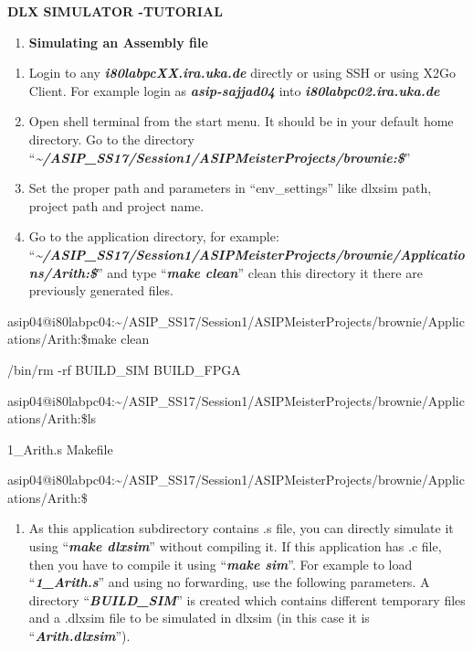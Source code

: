 \documentclass[
]{article}
\author{}
\date{}
\begin{document}
\textbf{DLX SIMULATOR -TUTORIAL}

\begin{enumerate}
\def\labelenumi{\Alph{enumi}.}
\item
  \textbf{Simulating an Assembly file}
\end{enumerate}

\begin{enumerate}
\def\labelenumi{\arabic{enumi}.}
\item
  Login to any \emph{\textbf{i80labpcXX.ira.uka.de}} directly or using
  SSH or using X2Go Client. For example login as
  \emph{\textbf{asip-sajjad04}} into
  \emph{\textbf{i80labpc02.ira.uka.de}}
\item
  Open shell terminal from the start menu. It should be in your default
  home directory. Go to the directory
  ``\emph{\textbf{\textasciitilde/ASIP\_SS17/Session1/ASIPMeisterProjects/brownie:\$}}''
\item
  Set the proper path and parameters in ``env\_settings'' like dlxsim
  path, project path and project name.
\item
  Go to the application directory, for example:
  ``\emph{\textbf{\textasciitilde/ASIP\_SS17/Session1/ASIPMeisterProjects/brownie/Applications/Arith:\$}}''
  and type ``\emph{\textbf{make clean}}'' clean this directory it there
  are previously generated files.
\end{enumerate}

asip04@i80labpc04:\textasciitilde/ASIP\_SS17/Session1/ASIPMeisterProjects/brownie/Applications/Arith:\$make
clean

/bin/rm -rf BUILD\_SIM BUILD\_FPGA

asip04@i80labpc04:\textasciitilde/ASIP\_SS17/Session1/ASIPMeisterProjects/brownie/Applications/Arith:\$ls

1\_Arith.s Makefile

asip04@i80labpc04:\textasciitilde/ASIP\_SS17/Session1/ASIPMeisterProjects/brownie/Applications/Arith:\$

\begin{enumerate}
\def\labelenumi{\arabic{enumi}.}
\setcounter{enumi}{4}
\item
  As this application subdirectory contains .s file, you can directly
  simulate it using ``\emph{\textbf{make dlxsim}}'' without compiling
  it. If this application has .c file, then you have to compile it using
  ``\emph{\textbf{make sim}}''. For example to load
  ``\emph{\textbf{1\_Arith.s}}'' and using no forwarding, use the
  following parameters. A directory ``\emph{\textbf{BUILD\_SIM}}'' is
  created which contains different temporary files and a .dlxsim file to
  be simulated in dlxsim (in this case it is
  ``\emph{\textbf{Arith.dlxsim}}'').
\end{enumerate}
\end{document}
